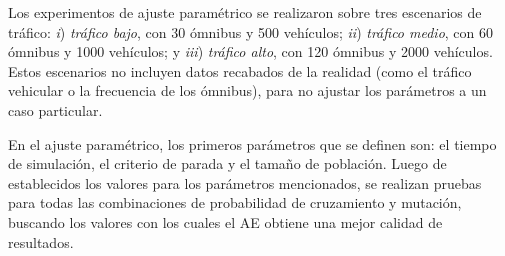 
Los experimentos de ajuste paramétrico se realizaron sobre tres escenarios de tráfico: \emph{i}) \emph{tráfico bajo}, con 30 ómnibus y 500 vehículos; \emph{ii}) \emph{tráfico medio}, con 60 ómnibus y 1000 vehículos; y \emph{iii}) \emph{tráfico alto}, con 120 ómnibus y 2000 vehículos. Estos escenarios no incluyen datos recabados de la realidad (como el tráfico vehicular o la frecuencia de los ómnibus), para no ajustar los parámetros a un caso particular.



En el ajuste paramétrico, los primeros parámetros que se definen son: el tiempo de simulación, el criterio de parada y el tamaño de población. Luego de establecidos los valores para los parámetros mencionados, se realizan pruebas para todas las combinaciones de probabilidad de cruzamiento y mutación, buscando los valores con los cuales el AE obtiene una mejor calidad de resultados.






